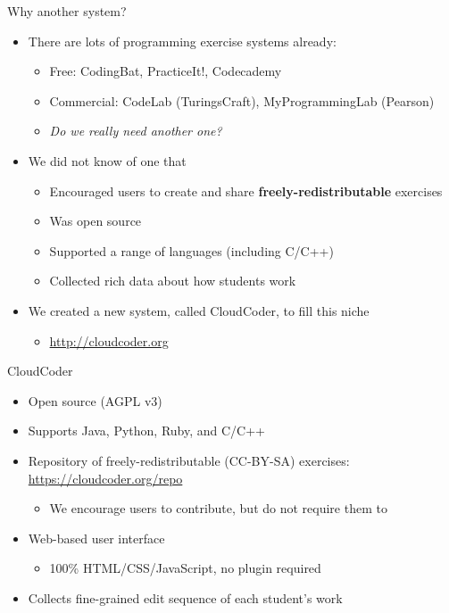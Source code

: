 \documentclass{beamer}
\begin{document}
\begin{frame}{Why another system?}

\begin{itemize}
  \item There are lots of programming exercise systems already:
  \begin{itemize}
    \item Free: CodingBat, PracticeIt!, Codecademy
    \item Commercial: CodeLab (TuringsCraft), MyProgrammingLab (Pearson)
    \item {\em Do we really need another one?}
  \end{itemize}
  \item We did not know of one that
  \begin{itemize}
    \item Encouraged users to create and share {\bf freely-redistributable} exercises
    \item Was open source
    \item Supported a range of languages (including C/C++)
    \item Collected rich data about how students work
  \end{itemize}
  \item We created a new system, called CloudCoder, to fill this niche
    \begin{itemize}
    \item \url{http://cloudcoder.org}
    \end{itemize}
\end{itemize}

\end{frame}

\begin{frame}{CloudCoder}

\begin{itemize}
  \item Open source (AGPL v3)
  \item Supports Java, Python, Ruby, and C/C++
  \item Repository of freely-redistributable (CC-BY-SA) exercises:
        \url{https://cloudcoder.org/repo}
    \begin{itemize}
    \item We encourage users to contribute, but do not require them to
    \end{itemize}
  \item Web-based user interface
    \begin{itemize}
    \item 100\% HTML/CSS/JavaScript, no plugin required
    \end{itemize}
  \item Collects fine-grained edit sequence of each student's work
\end{itemize}

\end{frame}
\end{document}
